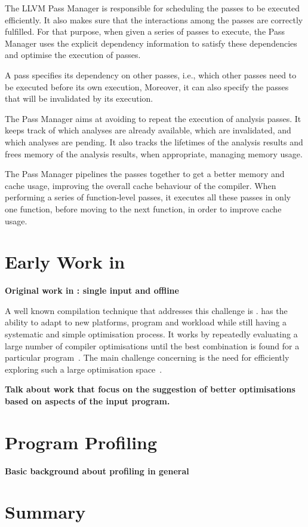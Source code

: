 The LLVM Pass Manager is responsible for scheduling the passes to be executed efficiently.
It also makes sure that the interactions among the passes are correctly fulfilled.
For that purpose, when given a series of passes to execute, the Pass Manager uses the explicit dependency information to satisfy these dependencies and optimise the execution of passes.

A pass specifies its dependency on other passes, i.e., which other passes need to be executed before its own execution,
Moreover, it can also specify the passes that will be invalidated by its execution.

The Pass Manager aims at avoiding to repeat the execution of analysis passes.
It keeps track of which analyses are already available, which are invalidated, and which analyses are pending.
It also tracks the lifetimes of the analysis results and frees memory of the analysis results, when appropriate, managing memory usage.

The Pass Manager pipelines the passes together to get a better memory and cache usage, improving the overall cache behaviour of the compiler.
When performing a series of function-level passes, it executes all these passes in only one function, before moving to the next function, in order to improve cache usage.

\section{Early Work in {\IterComp}}

\textbf{Original work in {\IterComp}: single input and offline}

A well known compilation technique that addresses this challenge is {\itercomp}.
{\Itercomp} has the ability to adapt to new platforms, program and workload while still having a systematic and simple optimisation process.
It works by repeatedly evaluating a large number of compiler optimisations until the best combination is found for a particular program~\citep{fursin07,chen10}.
The main challenge concerning {\itercomp} is the need for efficiently exploring such a large optimisation space~\citep{fursin07,cavazos07,zhou12}.

\textbf{Talk about work that focus on the suggestion of better optimisations based on aspects of the input program.}

\section{Program Profiling}

\textbf{Basic background about profiling in general}

\section{Summary}
